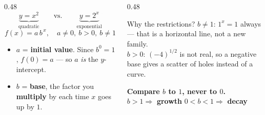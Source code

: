 \documentclass[aspectratio=169, 11pt]{beamer}
\begin{document}
\begin{frame}[t, plain]
  \begin{columns}[T]
    \begin{column}{0.48\textwidth}
      \[ \underbrace{y=x^{2}}_{\text{quadratic}} \qquad\text{vs.}\qquad
         \underbrace{y=2^{x}}_{\text{exponential}} \]
      \[ f(x)=a\,b^{\,x}, \quad a\ne0,\ b>0,\ b\ne1 \]
      \begin{itemize}\setlength{\itemsep}{4pt}
        \item $a$ = \textbf{initial value}. Since $b^{0}=1$, $f(0)=a$ --- so $a$ \emph{is} the
              $y$-intercept.
        \item $b$ = \textbf{base}, the factor you \textbf{multiply} by each time $x$ goes up by $1$.
      \end{itemize}
    \end{column}
    \begin{column}{0.48\textwidth}
      \begin{block}{Why the restrictions?}
        $b\ne1$: \; $1^{x}=1$ always --- that is a horizontal line, not a new family. \\[3pt]
        $b>0$: \; $(-4)^{1/2}$ is not real, so a negative base gives a scatter of holes instead of a
        curve.
      \end{block}
      \vspace{3pt}
      {\footnotesize \textbf{Compare $b$ to $1$, never to $0$.} \\[2pt]
      $b>1 \Rightarrow$ \textbf{growth} \quad $0<b<1 \Rightarrow$ \textbf{decay}}
    \end{column}
  \end{columns}
\end{frame}
\end{document}
